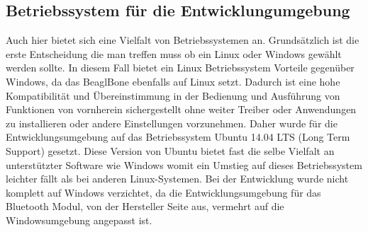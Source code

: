 \subsection{Betriebssystem für die Entwicklungumgebung}
Auch hier bietet sich eine Vielfalt von Betriebssystemen an. Grundsätzlich ist die erste Entscheidung die man treffen muss ob ein Linux oder Windows gewählt werden sollte.
In diesem Fall bietet ein Linux Betriebssystem Vorteile gegenüber Windows, da das BeaglBone ebenfalls auf Linux setzt. Dadurch ist eine hohe Kompatibilität und Übereinstimmung in der Bedienung und Ausführung von Funktionen von vornherein sichergestellt ohne weiter Treiber oder Anwendungen zu installieren oder andere Einstellungen vorzunehmen.
Daher wurde für die Entwicklungsumgebung auf das Betriebssystem Ubuntu 14.04 LTS (Long Term Support) gesetzt. Diese Version von Ubuntu bietet fast die selbe Vielfalt an unterstützter Software wie Windows womit ein Umstieg auf dieses Betriebssystem leichter fällt als bei anderen Linux-Systemen.
Bei der Entwicklung wurde nicht komplett auf Windows verzichtet, da die Entwicklungsumgebung für das Bluetooth Modul, von der Hersteller Seite aus, vermehrt auf die Windowsumgebung angepasst ist.